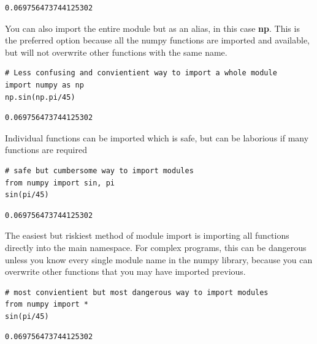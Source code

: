 \documentclass[%
oneside,                 %
final,                   %
10pt]{article}
\begin{document}
\begin{Verbatim}[numbers=none,fontsize=\fontsize{9pt}{9pt},baselinestretch=0.95,xleftmargin=2mm]
0.069756473744125302
\end{Verbatim}

You can also import the entire module but as an alias, in this case \textbf{np}. This is the preferred option because all the numpy functions are imported and available, but will not overwrite other functions with the same name.

\begin{Verbatim}[numbers=none,fontsize=\fontsize{9pt}{9pt},baselinestretch=0.95,xleftmargin=2mm]
# Less confusing and convientient way to import a whole module
import numpy as np
np.sin(np.pi/45)
\end{Verbatim}

\begin{Verbatim}[numbers=none,fontsize=\fontsize{9pt}{9pt},baselinestretch=0.95,xleftmargin=2mm]
0.069756473744125302
\end{Verbatim}

Individual functions can be imported which is safe, but can be laborious if many functions are required
\begin{Verbatim}[numbers=none,fontsize=\fontsize{9pt}{9pt},baselinestretch=0.95,xleftmargin=2mm]
# safe but cumbersome way to import modules
from numpy import sin, pi
sin(pi/45)
\end{Verbatim}

\begin{Verbatim}[numbers=none,fontsize=\fontsize{9pt}{9pt},baselinestretch=0.95,xleftmargin=2mm]
0.069756473744125302
\end{Verbatim}

The easiest but riskiest method of module import is importing all functions directly into the main namespace. For complex programs, this can be dangerous unless you know every single module name in the numpy library, because you can overwrite other functions that you may have imported previous.

\begin{Verbatim}[numbers=none,fontsize=\fontsize{9pt}{9pt},baselinestretch=0.95,xleftmargin=2mm]
# most convientient but most dangerous way to import modules
from numpy import *
sin(pi/45)
\end{Verbatim}

\begin{Verbatim}[numbers=none,fontsize=\fontsize{9pt}{9pt},baselinestretch=0.95,xleftmargin=2mm]
0.069756473744125302
\end{Verbatim}
\end{document}
